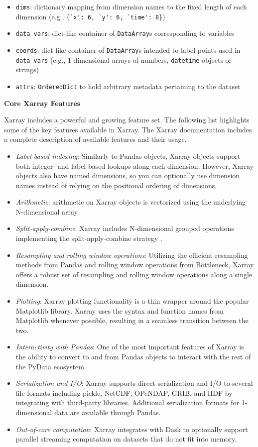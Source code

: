 \documentclass{jors}
\begin{document}
\begin{itemize}
	\item \verb|dims|: dictionary mapping from dimension names to the fixed length of each dimension (e.g., \verb|{`x': 6, `y': 6, `time': 8}|)
	\item \verb|data vars|: dict-like container of \verb|DataArray|s corresponding to variables
	\item \verb|coords|: dict-like container of \verb|DataArray|s intended to label points used in \verb|data vars| (e.g., 1-dimensional arrays of numbers, \verb|datetime| objects or strings)
	\item \verb|attrs|: \verb|OrderedDict| to hold arbitrary metadata pertaining to the dataset
\end{itemize}

\textbf{Core Xarray Features}

Xarray includes a powerful and growing feature set.
The following list highlights some of the key features available in Xarray.
The Xarray documentation \citep{Xarray_docs} includes a complete description of available features and their usage.

\begin{itemize}
	\item \textit{Label-based indexing}: Similarly to Pandas objects, Xarray objects support both integer- and label-based lookups along each dimension.
	However, Xarray objects also have named dimensions, so you can optionally use dimension names instead of relying on the positional ordering of dimensions.
	\item \textit{Arithmetic}: arithmetic on Xarray objects is vectorized using the underlying N-dimensional array.
	\item \textit{Split-apply-combine}: Xarray includes N-dimensional grouped operations implementing the split-apply-combine strategy \citep{wickham_2011}.
	\item \textit{Resampling and rolling window operations}: Utilizing the efficient resampling methods from Pandas and rolling window operations from Bottleneck, Xarray offers a robust set of resampling and rolling window operations along a single dimension.
	\item \textit{Plotting}: Xarray plotting functionality is a thin wrapper around the popular Matplotlib library.
	Xarray uses the syntax and function names from Matplotlib whenever possible, resulting in a seamless transition between the two.
	\item \textit{Interactivity with Pandas}: One of the most important features of Xarray is the ability to convert to and from Pandas objects to interact with the rest of the PyData ecosystem.
	\item \textit{Serialization and I/O}: Xarray supports direct serialization and I/O to several file formats including pickle, NetCDF, OPeNDAP, GRIB, and HDF by integrating with third-party libraries.
	Additional serialization formats for 1-dimensional data are available through Pandas.
	\item \textit{Out-of-core computation}: Xarray integrates with Dask to optionally support parallel streaming computation on datasets that do not fit into memory.
\end{itemize}
\end{document}
